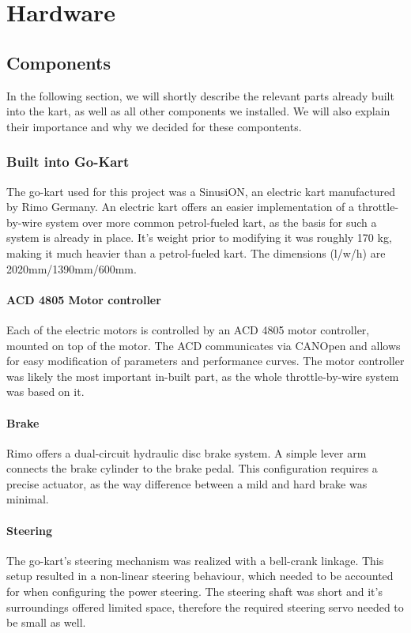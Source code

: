 
\chapter{Hardware}
\label{chp:Hardware}

\section{Components}
In the following section, we will shortly describe the relevant parts already built into the kart, as well as all other components we installed. We will also explain their importance and why we decided for these compontents.

\subsection{Built into Go-Kart}

The go-kart used for this project was a SinusiON, an electric kart manufactured by Rimo Germany. An electric kart offers an easier implementation of a throttle-by-wire system over more common petrol-fueled kart, as the basis for such a system is already in place. 
It's weight prior to modifying it was roughly 170 kg, making it much heavier than a petrol-fueled kart. The dimensions (l/w/h) are 2020mm/1390mm/600mm.


\subsubsection{ACD 4805 Motor controller}
Each of the electric motors is controlled by an ACD 4805 motor controller, mounted on top of the motor. The ACD communicates via CANOpen and allows for easy modification of parameters and performance curves. The motor controller was likely the most important in-built part, as the whole throttle-by-wire system was based on it.


\subsubsection{Brake}
Rimo offers a dual-circuit hydraulic disc brake system. A simple lever arm connects the brake cylinder to the brake pedal. This configuration requires a precise actuator, as the way difference between a mild and hard brake was minimal. 

\subsubsection{Steering}
The go-kart's steering mechanism was realized with a bell-crank linkage. This setup resulted in a non-linear steering behaviour, which needed to be accounted for when configuring the power steering. The steering shaft was short and it's surroundings offered limited space, therefore the required steering servo needed to be small as well.


